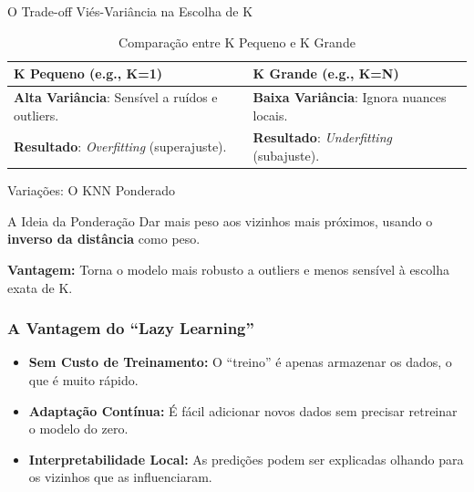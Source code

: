 \documentclass{beamer}
\begin{document}
\begin{frame}{O Trade-off Viés-Variância na Escolha de K}


\begin{table}[ht]
\centering
\label{tab:comparacaok}
\begin{tabular}{|>{\raggedright\arraybackslash}p{}|>{\raggedright\arraybackslash}p{}|}
\hline
\textbf{K Pequeno (e.g., K=1)} & \textbf{K Grande (e.g., K=N)} \\
\hline

\textbf{Alta Variância}: Sensível a ruídos e outliers. & \textbf{Baixa Variância}: Ignora nuances locais. \\
\hline
\textbf{Resultado}: \textit{Overfitting} (superajuste). & \textbf{Resultado}: \textit{Underfitting} (subajuste). \\
\hline
\end{tabular}
\caption{Comparação entre K Pequeno e K Grande}

\end{table}
\end{frame}



\begin{frame}{Variações: O KNN Ponderado}

    \begin{block}{A Ideia da Ponderação}
        Dar mais peso aos vizinhos mais próximos, usando o \textbf{inverso da distância} como peso.
    \end{block}
    
    \textbf{Vantagem:} Torna o modelo mais robusto a outliers e menos sensível à escolha exata de K.
\end{frame}


\begin{frame}
    \frametitle{A Vantagem do ``Lazy Learning''}
    \begin{itemize}
        \item \textbf{Sem Custo de Treinamento:} O ``treino'' é apenas armazenar os dados, o que é muito rápido.
        \item \textbf{Adaptação Contínua:} É fácil adicionar novos dados sem precisar retreinar o modelo do zero.
        \item \textbf{Interpretabilidade Local:} As predições podem ser explicadas olhando para os vizinhos que as influenciaram.
    \end{itemize}
\end{frame}
\end{document}
